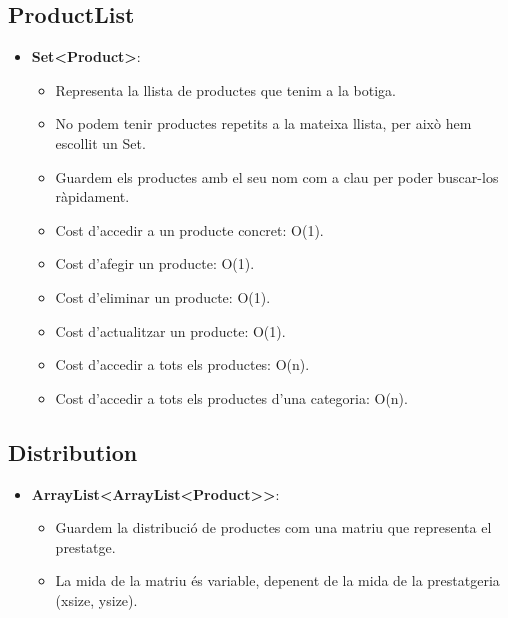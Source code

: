\documentclass[a4paper, t]{article}
\begin{document}
\subsection{ProductList}
\begin{itemize}
    \item \textbf{Set\textless Product\textgreater}: 
    \begin{itemize}
        \item Representa la llista de productes que tenim a la botiga.
        \item No podem tenir productes repetits a la mateixa llista, per això hem escollit un Set.
        \item Guardem els productes amb el seu nom com a clau per poder buscar-los ràpidament.
        \item Cost d’accedir a un producte concret: O(1).
        \item Cost d’afegir un producte: O(1).
        \item Cost d’eliminar un producte: O(1).
        \item Cost d’actualitzar un producte: O(1).
        \item Cost d’accedir a tots els productes: O(n).
        \item Cost d’accedir a tots els productes d’una categoria: O(n).
    \end{itemize}
\end{itemize}

\subsection{Distribution}
\begin{itemize}
    \item \textbf{ArrayList\textless ArrayList\textless Product\textgreater \textgreater}: 
    \begin{itemize}
        \item Guardem la distribució de productes com una matriu que representa el prestatge.
        \item La mida de la matriu és variable, depenent de la mida de la prestatgeria (xsize, ysize).
    \end{itemize}
\end{itemize}

\newpage
\end{document}
